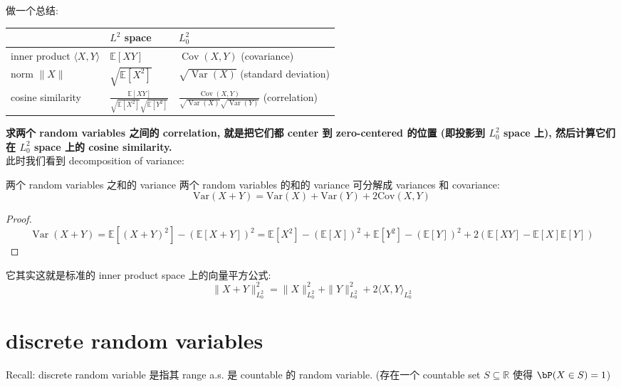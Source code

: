 做一个总结: 
\begin{center}
\renewcommand{\arraystretch}{1.25}
\setlength{\tabcolsep}{6pt}
\small
\begin{tabular}{|p{2.6cm}|p{5cm}|p{5cm}|}
\hline
& \textbf{$L^2$ space} & \textbf{$L_0^2$} \\
\hline
inner product $\langle X,Y\rangle$ & $\mathbb{E}[XY]$ & $\operatorname{Cov}(X,Y)$ (covariance) \\
\hline
norm $\|X\|$ & $\sqrt{\mathbb{E}[X^2]}$ & $\sqrt{\operatorname{Var}(X)}$ (standard deviation) \\
\hline
cosine similarity & $\frac{\mathbb{E}[XY]}{\sqrt{\mathbb{E}[X^2]} \sqrt{\mathbb{E}[Y^2]}}$ & $\frac{\operatorname{Cov}(X,Y)}{\sqrt{\operatorname{Var}(X)} \sqrt{\operatorname{Var}(Y)}}$ (correlation) \\
\hline
\end{tabular}
\end{center}
\textbf{求两个 random variables 之间的 correlation, 
就是把它们都 center 到 zero-centered 的位置 (即投影到 $L_0^2$ space 上),
然后计算它们在 $L_0^2$ space 上的 cosine similarity.}\\







此时我们看到 decomposition of variance: 
\begin{proposition}{两个 random variables 之和的 variance}
两个 random variables 的和的 variance 可分解成 variances 和 covariance:  
 \[\text{Var}(X+Y) = \text{Var}(X) + \text{Var}(Y) + 2\text{Cov}(X,Y)\]
\end{proposition}
\begin{proof}
 $$
\operatorname{Var}(X+Y)=\mathbb{E}\left[(X+Y)^2\right]-(\mathbb{E}[X+Y])^2=\mathbb{E}\left[X^2\right]-(\mathbb{E}[X])^2+\mathbb{E}\left[Y^2\right]-(\mathbb{E}[Y])^2+2(\mathbb{E}[X Y]-\mathbb{E}[X] \mathbb{E}[Y])
$$
\end{proof}
\begin{remark}

它其实这就是标准的 inner product space 上的向量平方公式:
$$
\|X+Y\|_{L_0^2}^2=\|X\|_{L_0^2}^2+\|Y\|_{L_0^2}^2+2\langle X, Y\rangle_{L_0^2}
$$
\end{remark}






\section{discrete random variables}
Recall: discrete random variable 是指其 range a.s. 是 countable 的 random variable.
(存在一个 countable set \(S \subseteq \mathbb{R}\) 
     使得 \(\bP(X \in S) = 1\))

